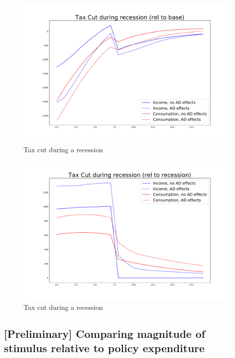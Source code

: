 \documentclass[]{article}
\begin{document}
\begin{figure} 
	\begin{centering}
		\includegraphics[width=\linewidth]{../50kSample_BaseCal/taxcut_recession.pdf}
		\caption{Tax cut during a recession}
		\label{fig:taxcutrecession}
	\end{centering}
\end{figure}
\begin{figure} 
	\begin{centering}
		\includegraphics[width=\linewidth]{../50kSample_BaseCal/taxcut_recession2.pdf}
		\caption{Tax cut during a recession}
		\label{fig:taxcutrecession2}
	\end{centering}
\end{figure}

\FloatBarrier
\subsection{[Preliminary] Comparing magnitude of stimulus relative to policy expenditure}
\end{document}
